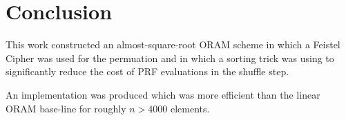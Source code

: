 \section{Conclusion}

This work constructed an almost-square-root ORAM scheme 
in which a Feistel Cipher was used for the permuation
and in which a sorting trick was using to significantly
reduce the cost of PRF evaluations in the shuffle step.

An implementation was produced which was more efficient than the 
linear ORAM base-line for roughly $n > 4000$ elements.


